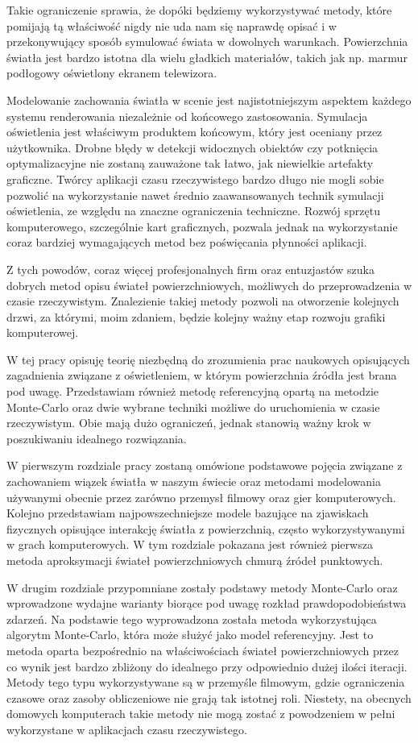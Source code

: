 \documentclass[../main.tex]{subfiles}
\begin{document}
Takie ograniczenie sprawia, że dopóki będziemy wykorzystywać metody, które pomijają tą właściwość nigdy nie uda nam się naprawdę opisać i w przekonywujący sposób symulować świata w dowolnych warunkach. Powierzchnia światła jest bardzo istotna dla wielu gładkich materiałów, takich jak np. marmur podłogowy oświetlony ekranem telewizora.

Modelowanie zachowania światła w scenie jest najistotniejszym aspektem każdego systemu renderowania niezależnie od końcowego zastosowania.
Symulacja oświetlenia jest właściwym produktem końcowym, który jest oceniany przez użytkownika. Drobne błędy w detekcji widocznych obiektów czy potknięcia optymalizacyjne nie zostaną zauważone tak łatwo, jak niewielkie artefakty graficzne. Twórcy aplikacji czasu rzeczywistego bardzo długo nie mogli sobie pozwolić na wykorzystanie nawet średnio zaawansowanych technik symulacji oświetlenia, ze względu na znaczne ograniczenia techniczne. Rozwój sprzętu komputerowego, szczególnie kart graficznych, pozwala jednak na wykorzystanie coraz bardziej wymagających metod bez poświęcania płynności aplikacji.

Z tych powodów, coraz więcej profesjonalnych firm oraz entuzjastów szuka dobrych metod opisu świateł powierzchniowych, możliwych do przeprowadzenia w czasie rzeczywistym. Znalezienie takiej metody pozwoli na otworzenie kolejnych drzwi, za którymi, moim zdaniem, będzie kolejny ważny etap rozwoju grafiki komputerowej.

W tej pracy opisuję teorię niezbędną do zrozumienia prac naukowych opisujących zagadnienia związane z oświetleniem, w którym powierzchnia źródła jest brana pod uwagę. Przedstawiam również metodę referencyjną opartą na metodzie Monte-Carlo oraz dwie wybrane techniki możliwe do uruchomienia w czasie rzeczywistym. Obie mają dużo ograniczeń, jednak stanowią ważny krok w poszukiwaniu idealnego rozwiązania.

W pierwszym rozdziale pracy zostaną omówione podstawowe pojęcia związane z zachowaniem wiązek światła w naszym świecie oraz metodami modelowania używanymi obecnie przez zarówno przemysł filmowy oraz gier komputerowych. Kolejno przedstawiam najpowszechniejsze modele bazujące na zjawiskach fizycznych opisujące interakcję światła z powierzchnią, często wykorzystywanymi w grach komputerowych. W tym rozdziale pokazana jest również pierwsza metoda aproksymacji świateł powierzchniowych chmurą źródeł punktowych.

W drugim rozdziale przypomniane zostały podstawy metody Monte-Carlo oraz wprowadzone wydajne warianty biorące pod uwagę rozkład prawdopodobieństwa zdarzeń. Na podstawie tego wyprowadzona została metoda wykorzystująca algorytm Monte-Carlo, która może służyć jako model referencyjny. Jest to metoda oparta bezpośrednio na właściwościach świateł powierzchniowych przez co wynik jest bardzo zbliżony do idealnego przy odpowiednio dużej ilości iteracji. Metody tego typu wykorzystywane są w przemyśle filmowym, gdzie ograniczenia czasowe oraz zasoby obliczeniowe nie grają tak istotnej roli. Niestety, na obecnych domowych komputerach takie metody nie mogą zostać z powodzeniem w pełni wykorzystane w aplikacjach czasu rzeczywistego.
\end{document}
